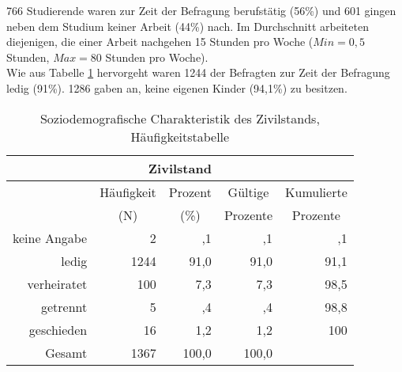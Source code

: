 766 Studierende waren zur Zeit der Befragung berufstätig (56\%) und 601 gingen neben dem Studium keiner Arbeit (44\%) nach. Im Durchschnitt arbeiteten diejenigen, die einer Arbeit nachgehen 15 Stunden pro Woche ($Min = 0,5$ Stunden, $Max = 80$ Stunden pro Woche).\\
Wie aus Tabelle \ref{table.sozidemoZivil} hervorgeht waren 1244 der Befragten zur Zeit der Befragung ledig (91\%). 1286 gaben an, keine eigenen Kinder (94,1\%) zu besitzen.
\begin{table}[ht] 
    \centering
    \caption{Soziodemografische Charakteristik des Zivilstands, Häufigkeitstabelle}
    \begin{tabular}[t]{|r|r|r|r|r|} 
        \hline
        \multicolumn{5}{|c|}{\textbf{Zivilstand}}\\ 
        \hline       
        \multicolumn{1}{|c}{} & \multicolumn{1}{c|}{Häufigkeit} & \multicolumn{1}{|c|}{Prozent} & \multicolumn{1}{|c|}{Gültige} & \multicolumn{1}{|c|}{Kumulierte}\\
        \multicolumn{1}{|c}{} & \multicolumn{1}{c|}{(N)} & \multicolumn{1}{|c|}{(\%)} & \multicolumn{1}{|c|}{Prozente} & \multicolumn{1}{|c|}{Prozente} \\
        \hline
        keine Angabe & 2 & ,1 & ,1 & ,1\\
        ledig & 1244 & 91,0 & 91,0 & 91,1\\
        verheiratet & 100 & 7,3 & 7,3 & 98,5\\
        getrennt & 5 & ,4 & ,4 & 98,8\\
        geschieden & 16 & 1,2 & 1,2 & 100\\
        Gesamt  & 1367 & 100,0 & 100,0 & \\
        \hline
    \end{tabular}
    \label{table.sozidemoZivil}
\end{table}
